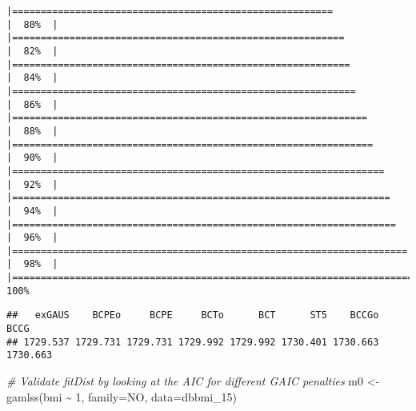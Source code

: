 \documentclass[
]{article}
\newenvironment{Shaded}{\begin{snugshade}}{\end{snugshade}}
\newcommand{\AttributeTok}[1]{\textcolor[rgb]{0.77,0.63,0.00}{#1}}
\newcommand{\CommentTok}[1]{\textcolor[rgb]{0.56,0.35,0.01}{\textit{#1}}}
\newcommand{\DecValTok}[1]{\textcolor[rgb]{0.00,0.00,0.81}{#1}}
\newcommand{\FunctionTok}[1]{\textcolor[rgb]{0.00,0.00,0.00}{#1}}
\newcommand{\NormalTok}[1]{#1}
\newcommand{\OtherTok}[1]{\textcolor[rgb]{0.56,0.35,0.01}{#1}}
\newcommand{\SpecialCharTok}[1]{\textcolor[rgb]{0.00,0.00,0.00}{#1}}
\begin{document}
\begin{verbatim}
|========================================================              |  80%  |                                                                              |==========================================================            |  82%  |                                                                              |===========================================================           |  84%  |                                                                              |============================================================          |  86%  |                                                                              |==============================================================        |  88%  |                                                                              |===============================================================       |  90%  |                                                                              |=================================================================     |  92%  |                                                                              |==================================================================    |  94%  |                                                                              |===================================================================   |  96%  |                                                                              |===================================================================== |  98%  |                                                                              |======================================================================| 100%
\end{verbatim}

\begin{Shaded}
\end{Shaded}

\begin{verbatim}
##   exGAUS    BCPEo     BCPE     BCTo      BCT      ST5    BCCGo     BCCG 
## 1729.537 1729.731 1729.731 1729.992 1729.992 1730.401 1730.663 1730.663
\end{verbatim}

\begin{Shaded}
\begin{Highlighting}[]
\CommentTok{\# Validate fitDist by looking at the AIC for different GAIC penalties}
\NormalTok{m0 }\OtherTok{\textless{}{-}} \FunctionTok{gamlss}\NormalTok{(bmi }\SpecialCharTok{\textasciitilde{}} \DecValTok{1}\NormalTok{, }\AttributeTok{family=}\NormalTok{NO, }\AttributeTok{data=}\NormalTok{dbbmi\_15)}
\end{Highlighting}
\end{Shaded}
\end{document}
